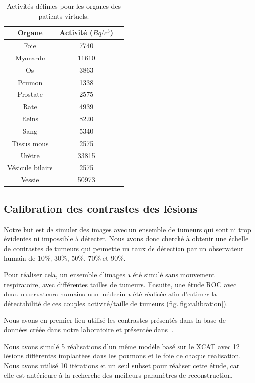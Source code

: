 \begin{table}
\centering
 \begin{tabular}{|c|c|c|} 
\hline
Organe 		& Activité ($Bq/c^3$) \\
\hline
\hline
Foie		& 7740		       \\
\hline
Myocarde	& 11610		       \\
\hline
Os		& 3863		       \\
\hline
Poumon 		& 1338 		       \\
\hline
Prostate	& 2575		       \\
\hline
Rate		& 4939		       \\
\hline
Reins		& 8220		       \\
\hline
Sang		& 5340		       \\
\hline
Tissus mous 	& 2575 		       \\
\hline
Urètre		& 33815		       \\
\hline
Vésicule bilaire& 2575		       \\
\hline
Vessie		& 50973		       \\
\hline
 \end{tabular}

\caption[Activités des organes des patients de la base de données]{Activités définies pour les organes des patients virtuels.}
\label{tab:activiteOrganes}
\end{table}

\subsection{Calibration des contrastes des lésions}
\label{lab:etudeDetect}
Notre but est de simuler des images avec un ensemble de tumeurs qui sont ni trop évidentes ni impossible à détecter. Nous avons donc cherché à obtenir une échelle de contrastes de tumeurs qui permette un taux de détection par un observateur humain de 10\%, 30\%, 50\%, 70\% et 90\%.

Pour réaliser cela, un ensemble d'images a été simulé sans mouvement respiratoire, avec différentes tailles de tumeurs. Ensuite, une étude ROC avec deux observateurs humains non médecin a été réalisée afin d'estimer la détectabilité de ces couples activité/taille de tumeurs (fig.\ref{fig:calibration}). 

Nous avons en premier lieu utilisé les contrastes présentés dans la base de données créée dans notre laboratoire et présentée dans~\cite{tomei2010oncopet_db}.

Nous avons simulé 5 réalisations d'un même modèle basé sur le XCAT avec 12 lésions différentes implantées dans les poumons et le foie de chaque réalisation. Nous avons utilisé 10 itérations et un seul subset pour réaliser cette étude, car elle est antérieure à la recherche des meilleurs paramètres de reconstruction.

